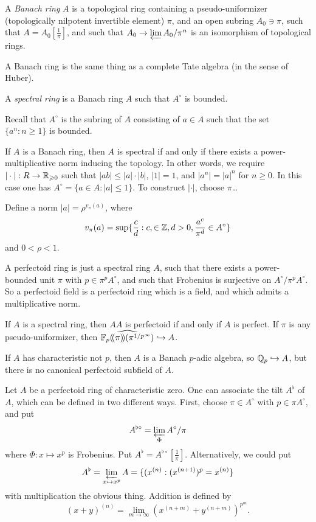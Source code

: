 \documentclass{article}
\begin{document}
\begin{definition}
A \emph{Banach ring} $A$ is a topological ring containing a pseudo-uniformizer 
(topologically nilpotent invertible element) $\pi$, and an open subring 
$A_0\ni \pi$, such that 
$A = A_0[\frac 1 \pi]$, and such that $A_0 \to \varprojlim A_0/\pi^n$ is an 
isomorphism of topological rings.  
\end{definition}

A Banach ring is the same thing as a complete Tate algebra (in the sense of 
Huber). 

\begin{definition}
A \emph{spectral ring} is a Banach ring $A$ such that $A^\circ$ is bounded. 
\end{definition}

Recall that $A^\circ$ is the subring of $A$ consisting of $a\in A$ such that the 
set $\{a^n:n\geqslant 1\}$ is bounded. 

If $A$ is a Banach ring, then $A$ is spectral if and only if there exists a 
power-multiplicative norm inducing the topology. In other words, 
we require $|\cdot|:R\to \mathbb{R}_{\geqslant 0}$ such that $|a b|\leqslant |a|\cdot |b|$, 
$|1|=1$, and $|a^n|=|a|^n$ for $n\geqslant 0$. In this case one has 
$A^\circ=\{a\in A:|a|\leqslant 1\}$. To construct $|\cdot|$, choose 
$\pi$\ldots

Define a norm $|a|=\rho^{v_\pi(a)}$, where 
\[
  v_\pi(a) = \sup \{\frac c d: c,\in \mathbb{Z},d>0, \frac{a^c}{\pi^d}\in A^\circ\}
\]
and $0<\rho<1$. 

A perfectoid ring is just a spectral ring $A$, such that there exists a 
power-bounded unit $\pi$ with $p\in \pi^p A^\circ$, and such that 
Frobenius is surjective on $A^\circ/\pi^p A^\circ$. So a perfectoid field is a 
perfectoid ring which is a field, and which admits a multiplicative norm. 

If $A$ is a spectral ring, then $AA$ is perfectoid if and only if $A$ is 
perfect. If $\pi$ is any pseudo-uniformizer, then 
$\widehat{\mathbb{F}_p(\!( {\pi} )\!) (\pi^{1/p^\infty})}\hookrightarrow A$. 

If $A$ has characteristic not $p$, then $A$ is a Banach $p$-adic algebra, so 
$\mathbb{Q}_p\hookrightarrow A$, but there is no canonical perfectoid subfield of 
$A$. 

Let $A$ be a perfectoid ring of characteristic zero. One can associate the 
tilt $A^\flat$ of $A$, which can be defined in two different ways. First, 
choose $\pi\in A^\circ$ with $p\in \pi A^\circ$, and put 
\[
  A^{\flat\circ} = \varprojlim_\Phi A^\circ/\pi
\]
where $\Phi:x\mapsto x^p$ is Frobenius. Put $A^\flat=A^{\flat\circ}[\frac 1 \pi]$. 
Alternatively, we could put 
\[
  A^\flat = \varprojlim_{x\mapsto x^p} A = \{(x^{(n)}:(x^{(n+1)})^p = x^{(n)}\}
\]
with multiplication the obvious thing. Addition is defined by 
\[
  (x+y)^{(n)} = \lim_{m\to \infty} (x^{(n+m)} + y^{(n+m)})^{p^m} .
\]
\end{document}
